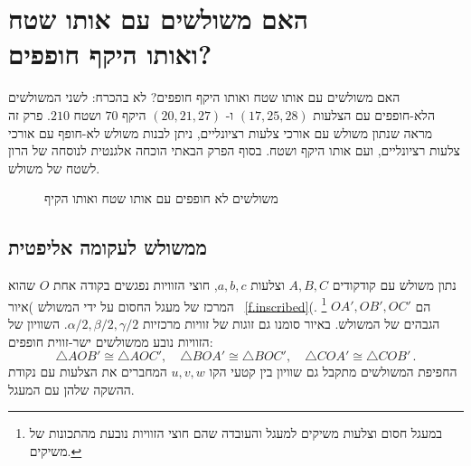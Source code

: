 


\chapter[\R{האם משולשים עם אותו שטח ואותו היקף חופפים?}]{האם משולשים עם אותו שטח\\
ואותו היקף חופפים?}
\label{c.congruent}


האם משולשים עם אותו שטח ואותו היקף חופפים? לא בהכרח: לשני המשולשים הלא-חופפים עם הצלעות
$(17,25,28)$
ו-%
$(20,21,27)$
היקף
$70$
ושטח 
$210$.
פרק זה מראה שנתון משולש עם אורכי צלעות רציונליים, ניתן לבנות משולש לא-חופף עם אורכי צלעות רציונליים, ועם אותו היקף ושטח.
בסוף הפרק הבאתי הוכחה אלגנטית לנוסחה של הרון לשטח של משולש.

\begin{figure}[htb]
\begin{center}
\end{center}
\caption{משולשים לא חופפים עם אותו שטח ואותו הקיף}\label{f.congruent-first-example}
\end{figure}


\section{ממשולש לעקומה אליפטית}

נתון משולש עם קודקודים
$A,B,C$
וצלעות
$a,b,c$,
חוצי הזוויות נפגשים בקודה אחת
$O$
שהוא המרכז של מעגל החסום על ידי המשולש )איור~%
\ref{f.inscribed}(.%
\footnote{במעגל חסום וצלעות משיקים למעגל והעובדה שהם חוצי הזוויות נובעת מהתכונות של משיקים.}
$OA',OB',OC'$
הם הגבהים של המשולש. באיור סומנו גם זוגות של זוויות מרכזיות
$\alpha/2,\beta/2,\gamma/2$.
השוויון של הזוויות נובע ממשולשים ישר-זווית חופפים:
\[
\triangle AOB'\cong \triangle AOC',\quad \triangle BOA'\cong \triangle BOC', \quad \triangle COA'\cong \triangle COB'\,.
\]
החפיפת המשולשים מתקבל גם שוויון בין קטעי הקו 
$u,v,w$
המחברים את הצלעות עם נקודת ההשקה שלהן עם המעגל.



